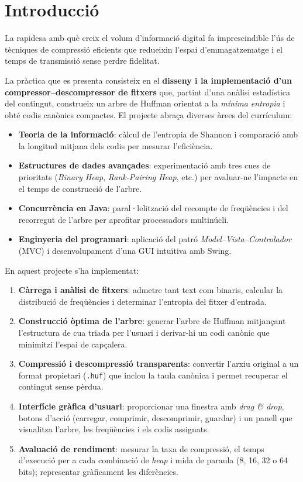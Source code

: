 \documentclass{ieeetj}
\begin{document}
\maketitle


\section{Introducció}
La rapidesa amb què creix el volum d’informació digital fa imprescindible l’ús de tècniques de compressió eficients que redueixin l’espai d’emmagatzematge i el temps de transmissió sense perdre fidelitat. 

La pràctica que es presenta consisteix en el \textbf{disseny i la implementació d’un compressor–descompressor de fitxers} que, partint d’una anàlisi estadística del contingut, construeix un arbre de Huffman orientat a la \emph{mínima entropia} i obté codis canònics compactes. El projecte abraça diverses àrees del currículum:

\begin{itemize}
  \item \textbf{Teoria de la informació}: càlcul de l’entropia de Shannon i comparació amb la longitud mitjana dels codis per mesurar l’eficiència.
  \item \textbf{Estructures de dades avançades}: experimentació amb tres cues de prioritats (\emph{Binary Heap}, \emph{Rank-Pairing Heap}, etc.) per avaluar-ne l’impacte en el temps de construcció de l’arbre.
  \item \textbf{Concurrència en Java}: paral·lelització del recompte de freqüències i del recorregut de l’arbre per aprofitar processadors multinúcli.
  \item \textbf{Enginyeria del programari}: aplicació del patró \emph{Model–Vista–Controlador} (MVC) i desenvolupament d’una GUI intuïtiva amb Swing.
\end{itemize}

\noindent
En aquest projecte s'ha implementat:
\begin{enumerate}
  \item \textbf{Càrrega i anàlisi de fitxers}: admetre tant text com binaris, calcular la distribució de freqüències i determinar l’entropia del fitxer d’entrada.
  \item \textbf{Construcció òptima de l’arbre}: generar l’arbre de Huffman mitjançant l’estructura de cua triada per l’usuari i derivar-hi un codi canònic que minimitzi l’espai de capçalera.
  \item \textbf{Compressió i descompressió transparents}: convertir l’arxiu original a un format propietari (\texttt{.huf}) que inclou la taula canònica i permet recuperar el contingut sense pèrdua.
  \item \textbf{Interfície gràfica d’usuari}: proporcionar una finestra amb \emph{drag \& drop}, botons d’acció (carregar, comprimir, descomprimir, guardar) i un panell que visualitza l’arbre, les freqüències i els codis assignats.
  \item \textbf{Avaluació de rendiment}: mesurar la taxa de compressió, el temps d’execució  per a cada combinació de \emph{heap} i mida de paraula (8, 16, 32 o 64 bits); representar gràficament les diferències.
 \end{enumerate}
\end{document}

